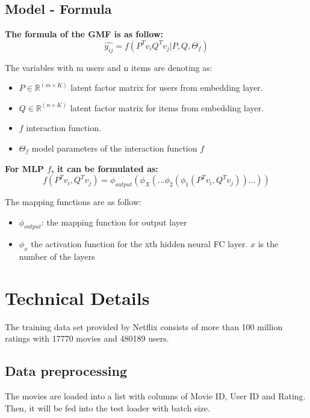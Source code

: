 \documentclass[final]{cvpr}
\newcommand{\R}{\mathbb{R}}
\begin{document}
\subsection{Model - Formula}
\bigskip
\textbf{ The formula of the GMF is as follow:}
$$\hat{y_{ij}} = f(P^T v_i Q^T v_j|P,Q,\Theta_f)$$

The variables with m users and n items are denoting as:
\begin{itemize}
    \item $P \in \R^{(m \times K)}$ latent factor matrix for users from embedding layer.
    \item $Q \in \R ^{(n \times K)}$ latent factor matrix for items from embedding layer.
    \item $f$ interaction function.    
    \item $\Theta_{f}$ model parameters of the interaction function $f$
\end{itemize}

\bigskip
\textbf{ For MLP $f$, it can be formulated as:}
$$f(P^T v_i, Q^T v_j) = \phi_{output}(\phi_X(...\phi_2(\phi_1(P^T v_i, Q^T v_j))...))$$

The mapping functions are as follow:
\begin{itemize}
    \item $\phi_{output}$: the mapping function for output layer
    \item $\phi_x$ the activation function for the xth hidden neural FC layer. $x$ is the number of the layers
\end{itemize}

\section{Technical Details}
The training data set provided by Netflix consists of more than 100 million ratings with 17770 movies and 480189 users.

\subsection{Data preprocessing}
The movies are loaded into a list with columns of Movie ID, User ID and Rating. Then, it will be fed into the test loader with batch size.
\end{document}
